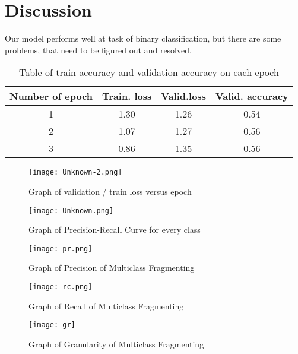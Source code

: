 \documentclass{article}
\begin{document}
\section{Discussion}

Our model performs well at task of binary classification, but there are some problems, that need to be figured out and resolved.


\begin{table}[bhtp]
	\centering
	\caption{Table of train accuracy and validation accuracy on each epoch}
	\label{tbl:space_and_subspace}
	\begin{tabular}{| c | c | c | c | }
		\hline
		Number of epoch & Train. loss & Valid.loss & Valid. accuracy \\
		\hline
		1 & 1.30  & 1.26 & 0.54  \\
        \hline
		2 & 1.07 & 1.27 & 0.56  \\
		\hline
        3 & 0.86  & 1.35 & 0.56  \\
        \hline
	\end{tabular}
\end{table}

\begin{figure}[bhtp]
	\texttt{[image: Unknown-2.png]}
	\caption{Graph of validation / train loss versus epoch}
	\label{fig:1}
\end{figure}


\begin{figure}[bhtp]
	\texttt{[image: Unknown.png]}
	\caption{Graph of Precision-Recall Curve for every class}
	\label{fig:2}
\end{figure}

\begin{figure}[bhtp]
	\texttt{[image: pr.png]}
	\caption{Graph of Precision of Multiclass Fragmenting}
	\label{fig:3}
\end{figure}

\begin{figure}[bhtp]
	\texttt{[image: rc.png]}
	\caption{Graph of Recall of Multiclass Fragmenting}
	\label{fig:4}
\end{figure}

\begin{figure}[bhtp]
	\texttt{[image: gr]}
	\caption{Graph of Granularity of Multiclass Fragmenting}
	\label{fig:5}
\end{figure}



\end{document}
